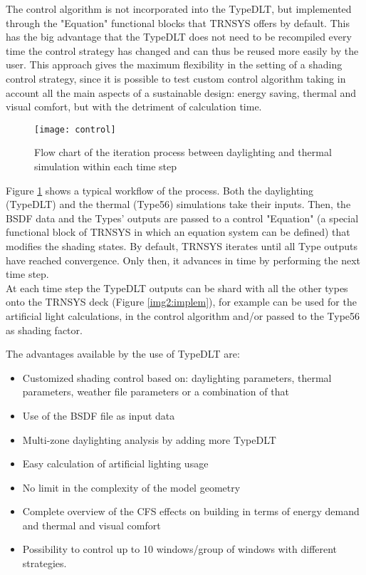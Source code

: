 The control algorithm is not incorporated into the TypeDLT, but implemented through the "Equation" functional blocks that TRNSYS offers by default. This has the big advantage that the TypeDLT does not need to be recompiled every time the control strategy has changed and can thus be reused more easily by the user.
This approach gives the maximum flexibility in the setting of a shading control strategy, since it is possible to test custom control algorithm taking in account all the main aspects of a sustainable design: energy saving, thermal and visual comfort, but with the detriment of calculation time.

\begin{figure}[h]
\centering
\texttt{[image: control]}
\caption{\label{img2:flow} Flow chart of the iteration process between daylighting and thermal simulation within each time step}
\end{figure}

Figure \ref{img2:flow} shows a typical workflow of the process. Both the daylighting (TypeDLT) and the thermal (Type56) simulations take their inputs. Then, the BSDF data and the Types' outputs are passed to a control "Equation" (a special functional block of TRNSYS in which an equation system can be defined) that modifies the shading states. By default, TRNSYS iterates until all Type outputs have reached convergence. Only then, it advances in time by performing the next time step.\\ 
At each time step the TypeDLT outputs can be shard with all the other types onto the TRNSYS deck (Figure \ref{img2:implem}), for example can be used for the artificial light calculations, in the control algorithm and/or passed to the Type56 as shading factor.


The advantages available by the use of TypeDLT are: 
\begin{itemize}
\renewcommand{\labelitemi}{\tiny$\blacksquare$}
\item Customized shading control based on: daylighting parameters, thermal parameters, weather file parameters or a combination of that
\item Use of the BSDF file as input data
\item Multi-zone daylighting analysis by adding more TypeDLT 
\item Easy calculation of artificial lighting usage
\item No limit in the complexity of the model geometry 
\item Complete overview of the CFS effects on building in terms of energy demand and thermal and visual comfort
\item Possibility to control up to 10 windows/group of windows with different strategies.
\end{itemize}


